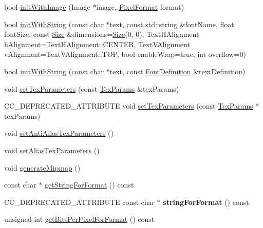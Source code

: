 \begin{DoxyCompactItemize}
bool \hyperlink{classTexture2D_a52292343ab1e6f4f3e20d35181d98b5f}{init\+With\+Image} (Image $\ast$image, \hyperlink{classTexture2D_a45d9d8bb5a0669def36bbdfbfb91d220}{Pixel\+Format} format)
\item 
bool \hyperlink{classTexture2D_af560d3c6590d2c656ae5b0d16c0a94d9}{init\+With\+String} (const char $\ast$text, const std\+::string \&font\+Name, float font\+Size, const \hyperlink{classSize}{Size} \&dimensions=\hyperlink{classSize}{Size}(0, 0), Text\+H\+Alignment h\+Alignment=Text\+H\+Alignment\+::\+C\+E\+N\+T\+ER, Text\+V\+Alignment v\+Alignment=Text\+V\+Alignment\+::\+T\+OP, bool enable\+Wrap=true, int overflow=0)
\item 
bool \hyperlink{classTexture2D_a2c00c9110a7fbaca76ea41e756dabeea}{init\+With\+String} (const char $\ast$text, const \hyperlink{structFontDefinition}{Font\+Definition} \&text\+Definition)
\item 
void \hyperlink{classTexture2D_acdea523f6f6306462129e45b185205e4}{set\+Tex\+Parameters} (const \hyperlink{classTexture2D_af2ea04a3dfcdf7274db17dda4bd555e3}{Tex\+Params} \&tex\+Params)
\item 
C\+C\+\_\+\+D\+E\+P\+R\+E\+C\+A\+T\+E\+D\+\_\+\+A\+T\+T\+R\+I\+B\+U\+TE void \hyperlink{classTexture2D_a002022936392284060c890589b3a4bca}{set\+Tex\+Parameters} (const \hyperlink{classTexture2D_af2ea04a3dfcdf7274db17dda4bd555e3}{Tex\+Params} $\ast$tex\+Params)
\item 
void \hyperlink{classTexture2D_a2b9bc7bc273b0793c6b58010c55724e6}{set\+Anti\+Alias\+Tex\+Parameters} ()
\item 
void \hyperlink{classTexture2D_affbb5fcc6fee13cfab17dada97d59904}{set\+Alias\+Tex\+Parameters} ()
\item 
void \hyperlink{classTexture2D_a91bccde122da02002c5518480474c177}{generate\+Mipmap} ()
\item 
const char $\ast$ \hyperlink{classTexture2D_a8d12a9614b12a67a7956182004e92ca0}{get\+String\+For\+Format} () const
\item 
\mbox{\label{classTexture2D_a4f33e9b9373d54060bf5edffd0dd8479}} 
C\+C\+\_\+\+D\+E\+P\+R\+E\+C\+A\+T\+E\+D\+\_\+\+A\+T\+T\+R\+I\+B\+U\+TE const char $\ast$ {\bfseries string\+For\+Format} () const
\item 
unsigned int \hyperlink{classTexture2D_af29476c171cc5167c8392265f80fb9af}{get\+Bits\+Per\+Pixel\+For\+Format} () const
\item 
\mbox{\label{classTexture2D_a931434c465fc156e8c4679829884aec3}} 

\end{DoxyCompactItemize}
